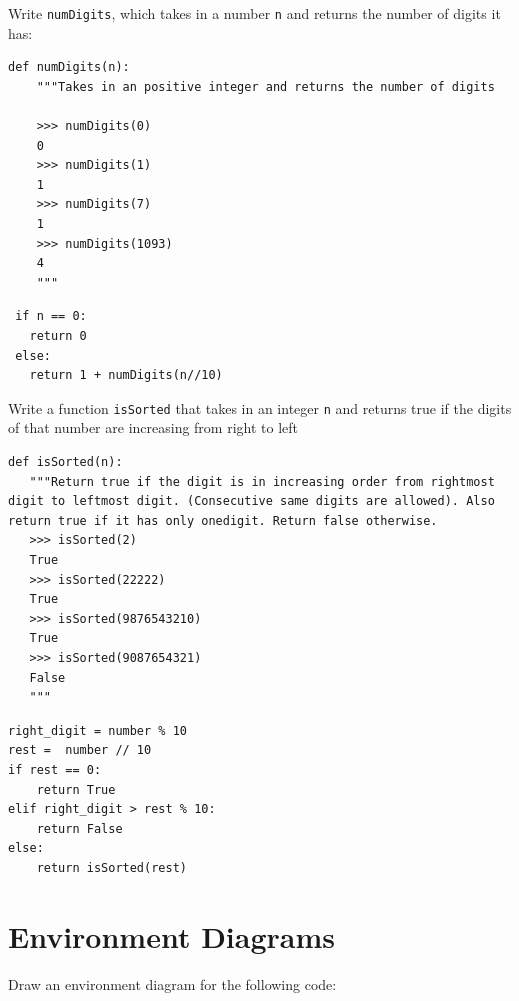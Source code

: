 \documentclass{exam}
\begin{document}
\begin{questions}


\begin{blocksection}
\question Write \texttt{numDigits}, which takes in a number \texttt{n} and returns the number of digits it has:

\begin{lstlisting}
def numDigits(n):
    """Takes in an positive integer and returns the number of digits

    >>> numDigits(0)
    0
    >>> numDigits(1)
    1
    >>> numDigits(7)
    1
    >>> numDigits(1093)
    4
    """
\end{lstlisting}

\begin{solution}[1in]
\begin{lstlisting}
 if n == 0:
   return 0
 else:
   return 1 + numDigits(n//10)
\end{lstlisting}
\end{solution}

\end{blocksection}



\begin{blocksection}
\question Write a function \texttt{isSorted} that takes in an integer \texttt{n} and returns true if the digits of that number are increasing from right to left

\begin{lstlisting}
def isSorted(n): 
   """Return true if the digit is in increasing order from rightmost digit to leftmost digit. (Consecutive same digits are allowed). Also return true if it has only onedigit. Return false otherwise.
   >>> isSorted(2)
   True
   >>> isSorted(22222)
   True
   >>> isSorted(9876543210)
   True
   >>> isSorted(9087654321)
   False
   """
\end{lstlisting}

\begin{solution}[1in]
\begin{lstlisting}
right_digit = number % 10
rest =  number // 10
if rest == 0:
    return True
elif right_digit > rest % 10:
    return False
else:
    return isSorted(rest)
\end{lstlisting}
\end{solution}

\end{blocksection}

\section{Environment Diagrams}
\begin{blocksection}
\question Draw an environment diagram for the following code:


\end{blocksection}
\end{questions}
\end{document}

